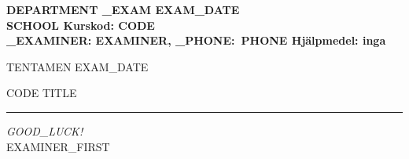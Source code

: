 \documentclass[a4paper,11pt]{article}
\begin{document}
\footnotesize
\bf\noindent
DEPARTMENT \hfill _EXAM EXAM_DATE \\
SCHOOL \hfill Kurskod: CODE \\
_EXAMINER: EXAMINER, _PHONE:~PHONE \hfill Hjälpmedel: inga

\linespread{1.5}

\bigskip

\begin{center}

  \Large\bf

  TENTAMEN EXAM_DATE

  \smallskip

  CODE TITLE

  \bigskip

\end{center}

\rm
\large

\hrule

\smallskip

\noindent


\bigskip

{\emph{GOOD_LUCK!} \\[1em] EXAMINER_FIRST}

\newpage
\end{document}
